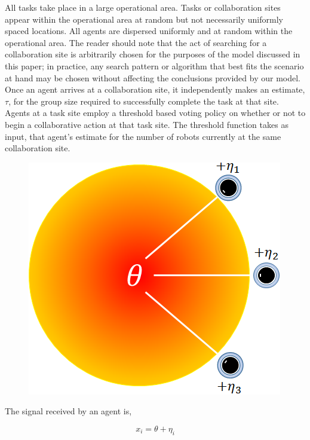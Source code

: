 \documentclass[conference]{IEEETran}
\begin{document}
All tasks take place in a large operational area. Tasks or collaboration sites appear within the operational area at random but not necessarily uniformly spaced locations. All agents are dispersed uniformly and at random within the operational area. The reader should note that the act of searching for a collaboration site is arbitrarily chosen for the purposes of the model discussed in this paper; in practice, any search pattern or algorithm that best fits the scenario at hand may be chosen without affecting the conclusions provided by our model. Once an agent arrives at a collaboration site, it independently makes an estimate, $\tau$, for the group size required to successfully complete the task at that site. Agents at a task site employ a threshold based voting policy on whether or not to begin a collaborative action at that task site. The threshold function takes as input, that agent's estimate for the number of robots currently at the same collaboration site.

\begin{figure}
\centering\includegraphics[width=\columnwidth]{../figures/globalgamesetup.png}
\centering\caption{}\label{fig:ggsetup}
\end{figure}

The signal received by an agent is,

\begin{equation}
	x_i = \theta + \eta_i
\end{equation}
\end{document}
